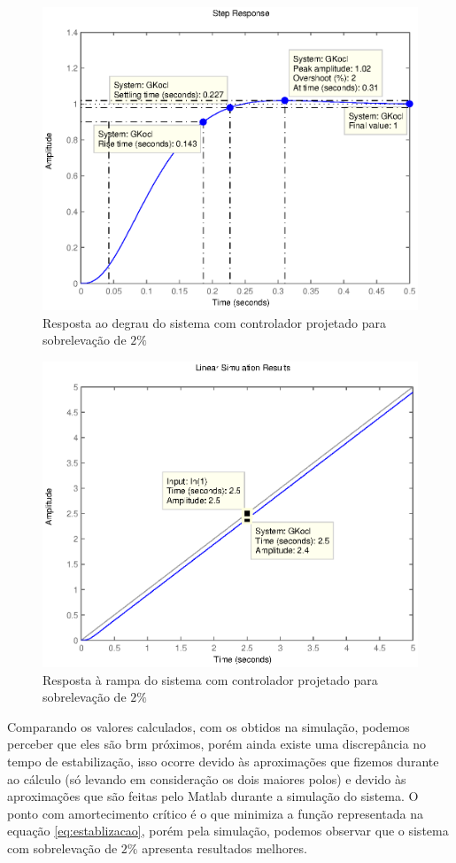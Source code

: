 \documentclass{article}
\begin{document}
   \begin{figure}[H]
   	\centering
   	\includegraphics[width=0.8\linewidth]{stepgkocl}
   	\caption{Resposta ao degrau do sistema com controlador projetado para sobrelevação de $2\%$}
   	\label{fig:stepgkocl}
   \end{figure}
   
   \begin{figure}[H]
   	\centering
   	\includegraphics[width=0.8\linewidth]{rampgkocl}
   	\caption{Resposta à rampa do sistema com controlador projetado para sobrelevação de $2\%$}
   	\label{fig:rampgkocl}
   \end{figure}
Comparando os valores calculados, com os obtidos na simulação, podemos perceber que eles são brm próximos, porém ainda existe uma discrepância no tempo de estabilização, isso ocorre devido às aproximações que fizemos durante ao cálculo (só levando em consideração os dois maiores polos) e devido às aproximações que são feitas pelo Matlab durante a simulação do sistema. 
O ponto com amortecimento crítico é o que minimiza a função representada na equação \ref{eq:establizacao}, porém pela simulação, podemos observar que o sistema com sobrelevação de $2\%$ apresenta resultados melhores.
\end{document}
